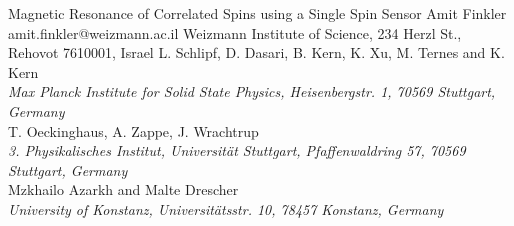 \begin{conf-abstract}[]
{Magnetic Resonance of Correlated Spins using a Single Spin Sensor}
{\color{blue} Amit Finkler}
{amit.finkler@weizmann.ac.il}
{Weizmann Institute of Science, 234 Herzl St., Rehovot 7610001, Israel}
{{\color{blue}L. Schlipf, D. Dasari, B. Kern, K. Xu, M. Ternes and K. Kern}\\ \textit{Max Planck Institute for Solid State Physics, Heisenbergstr. 1, 70569 Stuttgart, Germany}\\ 
{\color{blue}T. Oeckinghaus, A. Zappe, J. Wrachtrup}\\ \textit{ 3. Physikalisches Institut, Universität Stuttgart, Pfaffenwaldring 57, 70569 Stuttgart, Germany}\\ 
{\color{blue}Mzkhailo Azarkh and Malte Drescher}\\ \textit{University of Konstanz, Universitätsstr. 10, 78457 Konstanz, Germany}\\ 
\decofourleft \decofourright}





\printbibliography[heading=none]

\end{conf-abstract}
